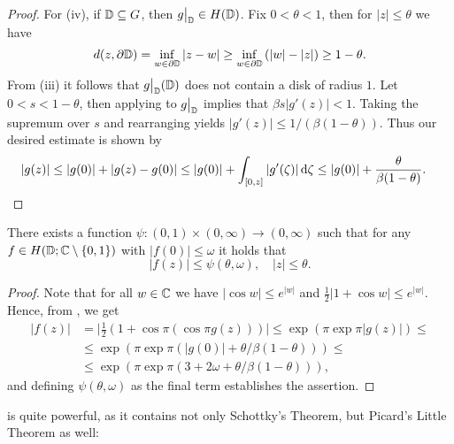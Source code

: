 \begin{proof}
    For (iv), if $\mathbb{D} \subseteq G$, then $\restr{g}{\D} \in H(\D)$. Fix $0 < \theta < 1$, then for $\vert z \vert \leq \theta$ we have
    $$ d(z, \partial \mathbb{D}) = \inf_{w \in \partial \mathbb{D}} \vert z - w \vert \geq \inf_{w \in \partial \mathbb{D}} \left( \vert w \vert - \vert z \vert \right) \geq 1 - \theta. $$
    From (iii) it follows that $\restr{g}{\D}(\D)$ does not contain a disk of radius $1$. Let $0 < s < 1 - \theta$, then applying  to $\restr{g}{\D}$ implies that $\beta s \vert g'(z) \vert < 1$. Taking the supremum over $s$ and rearranging yields $ \vert g'(z) \vert \leq 1 / (\beta (1 - \theta))$. Thus our desired estimate is shown by
    \begin{align*}
        \vert g(z) \vert &\leq \vert g(0) \vert + \vert g(z) - g(0) \vert \leq \vert g(0) \vert + \int_{[0, z]} \vert g'(\zeta) \vert \mathop{}\!\mathrm{d} \zeta \leq \vert g(0) \vert + \frac{\theta}{\beta (1 - \theta)}.
    \end{align*}
\end{proof}

\begin{theorem}[Schottky] \label{thm:schottky}
    There exists a function ${\psi : (0, 1) \times (0, \infty) \to (0, \infty)}$ such that for any $f \in H(\mathbb{D}; \mathbb{C} \setminus \{ 0, 1 \})$ with $\vert f(0) \vert \leq \omega$ it holds that
    \begin{equation}
        \vert f(z) \vert \leq \psi(\theta, \omega), \quad \vert z \vert \leq \theta.
    \end{equation}
\end{theorem}

\begin{proof}
    Note that for all $w \in \mathbb{C}$ we have $\vert \cos w \vert \leq e^{\vert w \vert}$ and $\frac{1}{2} \vert 1 + \cos w \vert \leq e^{\vert w \vert}$. Hence, from , we get
    \begin{align*}
        \vert f(z) \vert &= \vert {\textstyle \frac{1}{2}} ( 1 + \cos \pi ( \cos \pi g(z) ) ) \vert \leq \exp ( \pi \exp \pi \vert g(z) \vert ) \leq \\ &\leq \exp (\pi \exp \pi (\vert g(0) \vert + \theta / \beta(1 - \theta))) \leq \\
        &\leq \exp ( \pi \exp \pi ( 3 + 2 \omega + \theta / \beta(1 - \theta) ) ),
    \end{align*}
    and defining $\psi(\theta, \omega)$ as the final term establishes the assertion.
\end{proof}

 is quite powerful, as it contains not only Schottky's Theorem, but Picard's Little Theorem as well:

